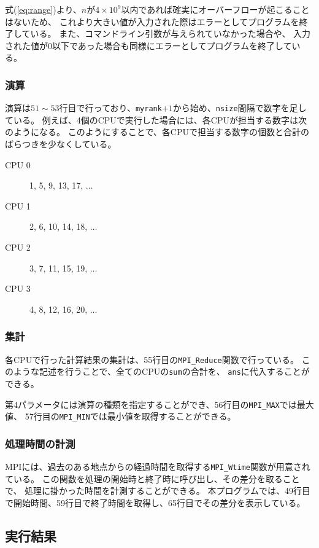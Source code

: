 \documentclass[a4j,titlepage]{jsarticle}
\begin{document}
式(\ref{eq:range})より、$n$が$4 \times 10^9$以内であれば確実にオーバーフローが起こることはないため、
これより大きい値が入力された際はエラーとしてプログラムを終了している。
また、コマンドライン引数が与えられていなかった場合や、
入力された値が0以下であった場合も同様にエラーとしてプログラムを終了している。

\subsubsection{演算}
演算は$51 \sim 53$行目で行っており、\texttt{myrank}$+1$から始め、\texttt{nsize}間隔で数字を足している。
例えば、4個のCPUで実行した場合には、各CPUが担当する数字は次のようになる。
このようにすることで、各CPUで担当する数字の個数と合計のばらつきを少なくしている。

\begin{description}
  \item[CPU 0] 1, 5, 9,  13, 17, $\dots$
  \item[CPU 1] 2, 6, 10, 14, 18, $\dots$
  \item[CPU 2] 3, 7, 11, 15, 19, $\dots$
  \item[CPU 3] 4, 8, 12, 16, 20, $\dots$
\end{description}

\subsubsection{集計}
各CPUで行った計算結果の集計は、55行目の\texttt{MPI\_Reduce}関数で行っている。
このような記述を行うことで、全てのCPUの\texttt{sum}の合計を、
\texttt{ans}に代入することができる。

第4パラメータには演算の種類を指定することができ、56行目の\texttt{MPI\_MAX}では最大値、
57行目の\texttt{MPI\_MIN}では最小値を取得することができる。

\subsubsection{処理時間の計測}
MPIには、過去のある地点からの経過時間を取得する\texttt{MPI\_Wtime}関数が用意されている。
この関数を処理の開始時と終了時に呼び出し、その差分を取ることで、
処理に掛かった時間を計測することができる。
本プログラムでは、49行目で開始時間、59行目で終了時間を取得し、65行目でその差分を表示している。

\subsection{実行結果}
\end{document}

